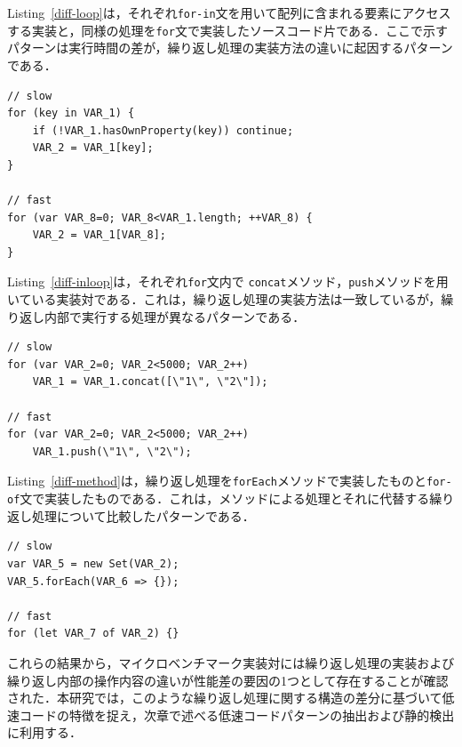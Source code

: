\documentclass[submit,techrep,noauthor]{ipsj}
\begin{document}
Listing~\ref{diff-loop}は，それぞれ\texttt{for-in}文を用いて配列に含まれる要素にアクセスする実装と，同様の処理を\texttt{for}文で実装したソースコード片である．ここで示すパターンは実行時間の差が，繰り返し処理の実装方法の違いに起因するパターンである．
\begin{lstlisting}[caption=Pairs with loop differences, label=diff-loop, captionpos=t, columns=flexible]
// slow
for (key in VAR_1) {
    if (!VAR_1.hasOwnProperty(key)) continue;
    VAR_2 = VAR_1[key];
}

// fast
for (var VAR_8=0; VAR_8<VAR_1.length; ++VAR_8) {
    VAR_2 = VAR_1[VAR_8];
}
\end{lstlisting}

Listing~\ref{diff-inloop}は，それぞれ\texttt{for}文内で \texttt{concat}メソッド，\texttt{push}メソッドを用いている実装対である．これは，繰り返し処理の実装方法は一致しているが，繰り返し内部で実行する処理が異なるパターンである．
\begin{lstlisting}[caption=Pairs with differences within the loop, label=diff-inloop, captionpos=t, columns=flexible]
// slow
for (var VAR_2=0; VAR_2<5000; VAR_2++)
    VAR_1 = VAR_1.concat([\"1\", \"2\"]);

// fast
for (var VAR_2=0; VAR_2<5000; VAR_2++)
    VAR_1.push(\"1\", \"2\");
\end{lstlisting}

Listing~\ref{diff-method}は，繰り返し処理を\texttt{forEach}メソッドで実装したものと\texttt{for-of}文で実装したものである．これは，メソッドによる処理とそれに代替する繰り返し処理について比較したパターンである．
\begin{lstlisting}[caption=Pairs of Method and alternative loop, label=diff-method, captionpos=t, columns=flexible]
// slow
var VAR_5 = new Set(VAR_2);
VAR_5.forEach(VAR_6 => {});

// fast
for (let VAR_7 of VAR_2) {}
\end{lstlisting}

これらの結果から，マイクロベンチマーク実装対には繰り返し処理の実装および繰り返し内部の操作内容の違いが性能差の要因の1つとして存在することが確認された．本研究では，このような繰り返し処理に関する構造の差分に基づいて低速コードの特徴を捉え，次章で述べる低速コードパターンの抽出および静的検出に利用する．


\end{document}
